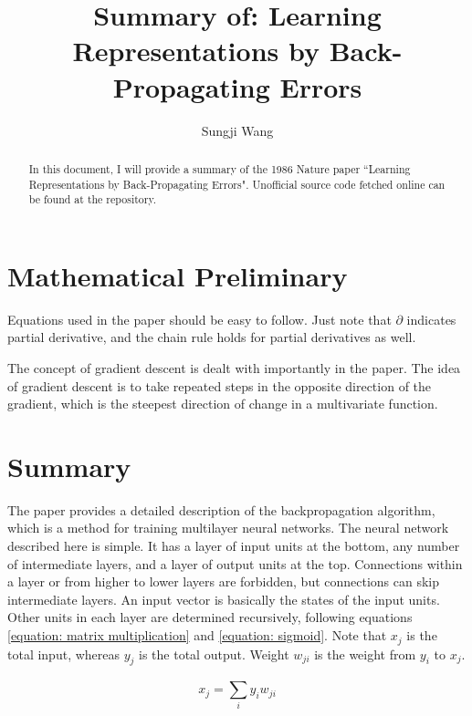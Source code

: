 \documentclass{article}
\begin{document}
\title{Summary of: Learning Representations by Back-Propagating Errors}
\author[1]{Sungji Wang}
\maketitle

\begin{abstract}
    In this document, I will provide a summary of the 1986 Nature paper ``Learning Representations by Back-Propagating Errors".
    Unofficial source code fetched online can be found at the repository.
\end{abstract}

\section{Mathematical Preliminary}
Equations used in the paper should be easy to follow. Just note that ${\partial}$ indicates partial derivative, and the chain rule holds for partial derivatives as well.

The concept of gradient descent is dealt with importantly in the paper.
The idea of gradient descent is to take repeated steps in the opposite direction of the gradient, which is the steepest direction of change in a multivariate function.

\section{Summary}
The paper provides a detailed description of the backpropagation algorithm, which is a method for training multilayer neural networks.
The neural network described here is simple. It has a layer of input units at the bottom, any number of intermediate layers, and a layer of output units at the top.
Connections within a layer or from higher to lower layers are forbidden, but connections can skip intermediate layers.
An input vector is basically the states of the input units.
Other units in each layer are determined recursively, following equations \ref{equation: matrix multiplication} and \ref{equation: sigmoid}.
Note that $x_j$ is the total input, whereas $y_j$ is the total output.
Weight $w_{ji}$ is the weight from $y_i$ to $x_j$.

\begin{equation}
    x_j = \sum_{i}^{} {y_i w_{ji}}
    \label{equation: matrix multiplication}
\end{equation}
\end{document}
